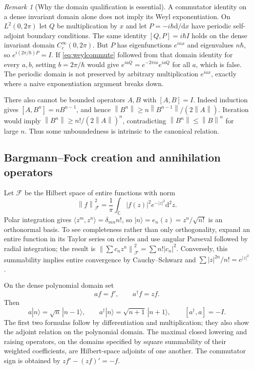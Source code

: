 \documentclass[11pt]{article}
\theoremstyle{definition}
\theoremstyle{remark}
\newtheorem{remark}[theorem]{Remark}
\newcommand{\C}{\mathbb C}
\newcommand{\dd}{\mathrm d}
\newcommand{\norm}[1]{\left\lVert #1\right\rVert}
\numberwithin{equation}{section}
\begin{document}
\begin{remark}[Why the domain qualification is essential]\label{rem:domaincounter}
A commutator identity on a dense invariant domain alone does not imply its Weyl exponentiation. On $L^2(0,2\pi)$ let $Q$ be multiplication by $x$ and let $P=-i\hbar\dd/\dd x$ have periodic self-adjoint boundary conditions. The same identity $[Q,P]=i\hbar I$ holds on the dense invariant domain $C_c^\infty(0,2\pi)$. But $P$ has eigenfunctions $e^{inx}$ and eigenvalues $n\hbar$, so
$e^{i(2\pi/\hbar)P}=I$. If \eqref{eq:weylcommute} followed from that domain identity for every $a,b$, setting $b=2\pi/\hbar$ would give
$e^{iaQ}=e^{-2\pi ia}e^{iaQ}$ for all $a$, which is false. The periodic domain is not preserved by arbitrary multiplication $e^{iax}$, exactly where a naive exponentiation argument breaks down.
\end{remark}
There also cannot be bounded operators $A,B$ with $[A,B]=I$. Indeed induction gives $[A,B^n]=nB^{n-1}$, and hence
$\norm{B^n}\geq n\norm{B^{n-1}}/(2\norm A)$.
Iteration would imply $\norm{B^n}\geq n!/(2\norm A)^n$, contradicting $\norm{B^n}\leq\norm B^n$ for large $n$. Thus some unboundedness is intrinsic to the canonical relation.

\subsection{Bargmann--Fock creation and annihilation operators}
Let $\mathcal F$ be the Hilbert space of entire functions with norm
\begin{equation}\label{eq:focknorm}
 \norm f_{\mathcal F}^2=\frac1\pi\int_{\C}|f(z)|^2e^{-|z|^2}\dd^2z.
\end{equation}
Polar integration gives
$\langle z^m,z^n\rangle=\delta_{mn}n!$, so
$|n\rangle=e_n(z)=z^n/\sqrt{n!}$ is an orthonormal basis. To see completeness rather than only orthogonality, expand an entire function in its Taylor series on circles and use angular Parseval followed by radial integration; the result is
$\norm{\sum c_nz^n}_{\mathcal F}^2=\sum n!|c_n|^2$. Conversely, this summability implies entire convergence by Cauchy--Schwarz and $\sum |z|^{2n}/n!=e^{|z|^2}$.

On the dense polynomial domain set
\begin{equation}\label{eq:creation}
 af=f',\qquad a^\dagger f=zf.
\end{equation}
Then
\begin{equation}\label{eq:ladder}
 a|n\rangle=\sqrt n\,|n-1\rangle,\qquad
 a^\dagger|n\rangle=\sqrt{n+1}\,|n+1\rangle,
 \qquad[a^\dagger,a]=-I.
\end{equation}
The first two formulas follow by differentiation and multiplication; they also show the adjoint relation on the polynomial domain. The maximal closed lowering and raising operators, on the domains specified by square summability of their weighted coefficients, are Hilbert-space adjoints of one another. The commutator sign is obtained by $z f'-(zf)'=-f$.
\end{document}
